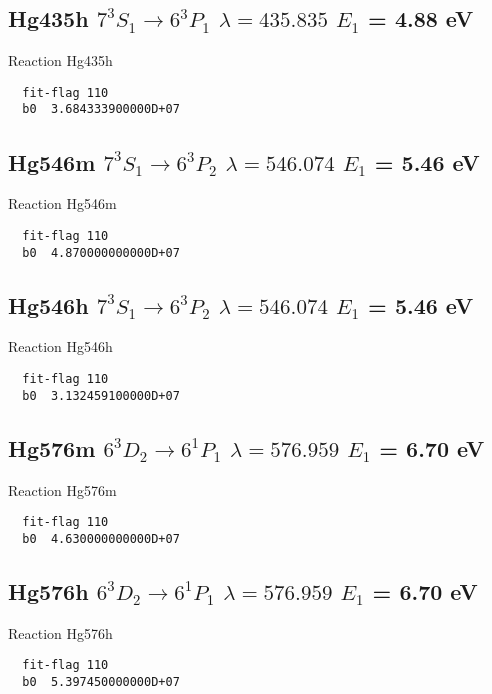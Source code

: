 \documentclass[12pt]{article}
\begin{document}
\subsection{
Hg435h   $7^3S_1 \rightarrow 6^3P_1 $ $\lambda= 435.835$ $E_1$ = 4.88 eV
}
Reaction Hg435h
\begin{small}\begin{verbatim}
  fit-flag 110
  b0  3.684333900000D+07
\end{verbatim}\end{small}

\subsection{
Hg546m   $7^3S_1 \rightarrow 6^3P_2 $ $\lambda= 546.074$ $E_1$ = 5.46 eV
}
Reaction Hg546m
\begin{small}\begin{verbatim}
  fit-flag 110
  b0  4.870000000000D+07
\end{verbatim}\end{small}

\subsection{
Hg546h   $7^3S_1 \rightarrow 6^3P_2 $ $\lambda= 546.074$ $E_1$ = 5.46 eV
}
Reaction Hg546h
\begin{small}\begin{verbatim}
  fit-flag 110
  b0  3.132459100000D+07
\end{verbatim}\end{small}

\subsection{
Hg576m   $6^3D_2 \rightarrow 6^1P_1 $ $\lambda= 576.959$ $E_1$ = 6.70 eV
}
Reaction Hg576m
\begin{small}\begin{verbatim}
  fit-flag 110
  b0  4.630000000000D+07
\end{verbatim}\end{small}

\subsection{
Hg576h   $6^3D_2 \rightarrow 6^1P_1 $ $\lambda= 576.959$ $E_1$ = 6.70 eV
}
Reaction Hg576h
\begin{small}\begin{verbatim}
  fit-flag 110
  b0  5.397450000000D+07
\end{verbatim}\end{small}
\end{document}
